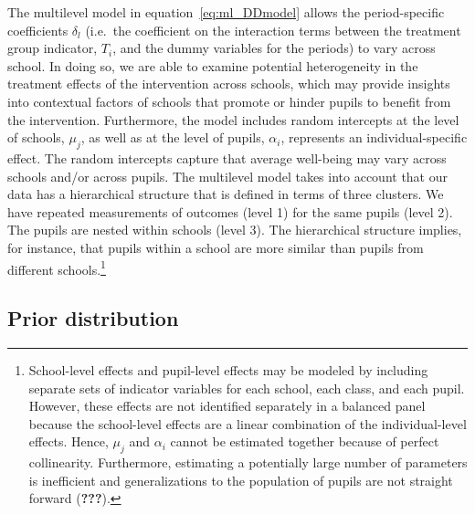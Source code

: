 \documentclass[a4, 12pt]{article}
\let\rmarkdownfootnote\footnote%
\def\footnote{\protect\rmarkdownfootnote}
\begin{document}
The multilevel model in equation~\ref{eq:ml_DDmodel} allows the period-specific coefficients \(\delta_l\) (i.e.~the coefficient on the interaction terms between the treatment group indicator, \(T_i\), and the dummy variables for the periods) to vary across school. In doing so, we are able to examine potential heterogeneity in the treatment effects of the intervention across schools, which may provide insights into contextual factors of schools that promote or hinder pupils to benefit from the intervention. Furthermore, the model includes random intercepts at the level of schools, \(\mu_j\), as well as at the level of pupils, \(\alpha_{i}\), represents an individual-specific effect. The random intercepts capture that average well-being may vary across schools and/or across pupils. The multilevel model takes into account that our data has a hierarchical structure that is defined in terms of three clusters. We have repeated measurements of outcomes (level 1) for the same pupils (level 2). The pupils are nested within schools (level 3). The hierarchical structure implies, for instance, that pupils within a school are more similar than pupils from different schools.\footnote{School-level effects and pupil-level effects may be modeled by including separate sets of indicator variables for each school, each class, and each pupil. However, these effects are not identified separately in a balanced panel because the school-level effects are a linear combination of the individual-level effects. Hence, \(\mu_j\) and \(\alpha_{i}\) cannot be estimated together because of perfect collinearity. Furthermore, estimating a potentially large number of parameters is inefficient and generalizations to the population of pupils are not straight forward ({\textbf{???}}).}

\hypertarget{prior-distribution}{%
\subsection{Prior distribution}\label{prior-distribution}}
\end{document}
